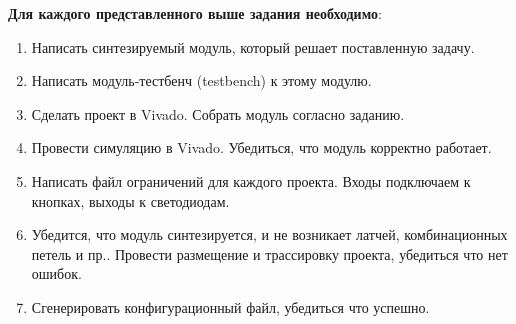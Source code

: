 \textbf{Для каждого представленного выше задания необходимо}:
\begin{enumerate}
\item Написать синтезируемый модуль, который решает поставленную задачу.
\item Написать модуль-тестбенч (testbench) к этому модулю.
\item Сделать проект в Vivado. Собрать модуль согласно заданию. 
\item Провести симуляцию в Vivado. Убедиться, что модуль корректно работает.
\item Написать файл ограничений для каждого проекта. Входы подключаем к кнопках, выходы к светодиодам.
\item Убедится, что модуль синтезируется, и не возникает латчей, комбинационных петель и пр.. Провести размещение и трассировку проекта, убедиться что нет ошибок. 
\item Сгенерировать конфигурационный файл, убедиться что успешно.
\end{enumerate}